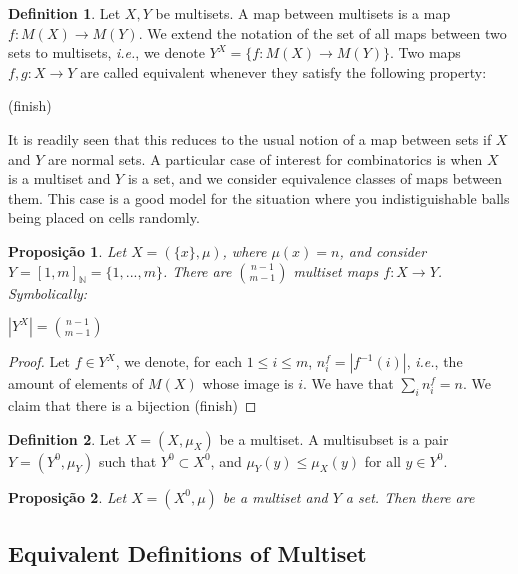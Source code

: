 \documentclass[]{article}
\newtheorem{proposition}{Proposição}[section]
\theoremstyle{definition}
\newtheorem{definition}{Definition}[section]
\theoremstyle{definition}
\newcommand{\raw}{\rightarrow}
\newcommand{\ie}{\textit{i.e.}}
\newcommand{\bb}{\mathbb}
\newcommand{\mum}{^{-1}}
\begin{document}
\begin{definition}
	Let $X, Y$ be multisets. A map between multisets is a map $f:M(X) \raw M(Y)$. We extend the notation of the set of all maps between two sets to multisets, \ie, we denote $Y^X=\{f:M(X) \raw M(Y) \}$. Two maps $f, g: X \raw Y$ are called equivalent whenever they satisfy the following property:
	
	\begin{center}
		(finish)
	\end{center}
\end{definition}

It is readily seen that this reduces to the usual notion of a map between sets if $X$ and $Y$ are normal sets. A particular case of interest for combinatorics is when $X$ is a multiset and $Y$ is a set, and we consider equivalence classes of maps between them. This case is a good model for the situation where you indistiguishable balls being placed on cells randomly.

\begin{proposition}
	Let $X=(\{x\}, \mu)$, where $\mu(x) = n$, and consider $Y = [1, m]_{\bb{N}} = \{1, ..., m \}$. There are $\binom{n-1}{m-1}$ multiset maps $f:X \raw Y$. Symbolically:
	
	\begin{center}
		$|Y^X|= \binom{n-1}{m-1}$
	\end{center}
\end{proposition}

\begin{proof}
	Let $f \in Y^X$, we denote, for each $1 \leq i \leq m$, $n_i^f=|f\mum(i)|$, \ie, the amount of elements of $M(X)$ whose image is $i$. We have that $\sum_i n_i^f = n$. We claim that there is a bijection (finish)
\end{proof}

\begin{definition}
	Let $X=(X, \mu_X)$ be a multiset. A multisubset is a pair $Y=(Y^0, \mu_Y)$ such that $Y^0 \subset X^0$, and $\mu_Y(y)\leq\mu_X(y)$ for all $y \in Y^0$.
\end{definition}

\begin{proposition}
	Let $X=(X^0, \mu)$ be a multiset and $Y$ a set. Then there are 
\end{proposition}



\subsection{Equivalent Definitions of Multiset}
\end{document}
